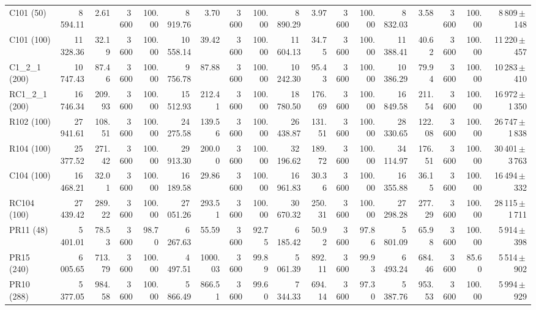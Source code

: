 \documentclass[11pt]{article}
\begin{document}
\begin{table}[H]
{\begin{tabular}{l rrrr rrrr rrrr rrrr r}
C101 (50) & 8\,594.11 & 2.61 & 3\,600 & 100.00 & 8\,919.76 & 3.70 & 3\,600 & 100.00 & 8\,890.29 & 3.97 & 3\,600 & 100.00 & 8\,832.03 & 3.58 & 3\,600 & 100.00 & 8\,809\,$\pm$\,148 \\
C101 (100) & 11\,328.36 & 32.19 & 3\,600 & 100.00 & 10\,558.14 & 39.42 & 3\,600 & 100.00 & 11\,604.13 & 34.75 & 3\,600 & 100.00 & 11\,388.41 & 40.62 & 3\,600 & 100.00 & 11\,220\,$\pm$\,457 \\
C1\_2\_1 (200) & 10\,747.43 & 87.46 & 3\,600 & 100.00 & 9\,756.78 & 87.88 & 3\,600 & 100.00 & 10\,242.30 & 95.43 & 3\,600 & 100.00 & 10\,386.29 & 79.94 & 3\,600 & 100.00 & 10\,283\,$\pm$\,410 \\
\midrule
RC1\_2\_1 (200) & 16\,746.34 & 209.93 & 3\,600 & 100.00 & 15\,512.93 & 212.41 & 3\,600 & 100.00 & 18\,780.50 & 176.69 & 3\,600 & 100.00 & 16\,849.58 & 211.54 & 3\,600 & 100.00 & 16\,972\,$\pm$\,1\,350 \\
\midrule
R102 (100) & 27\,941.61 & 108.51 & 3\,600 & 100.00 & 24\,275.58 & 139.56 & 3\,600 & 100.00 & 26\,438.87 & 131.51 & 3\,600 & 100.00 & 28\,330.65 & 122.08 & 3\,600 & 100.00 & 26\,747\,$\pm$\,1\,838 \\
R104 (100) & 25\,377.52 & 271.42 & 3\,600 & 100.00 & 29\,913.30 & 200.00 & 3\,600 & 100.00 & 32\,196.62 & 189.72 & 3\,600 & 100.00 & 34\,114.97 & 176.51 & 3\,600 & 100.00 & 30\,401\,$\pm$\,3\,763 \\
C104 (100) & 16\,468.21 & 32.01 & 3\,600 & 100.00 & 16\,189.58 & 29.86 & 3\,600 & 100.00 & 16\,961.83 & 30.36 & 3\,600 & 100.00 & 16\,355.88 & 36.15 & 3\,600 & 100.00 & 16\,494\,$\pm$\,332 \\
RC104 (100) & 27\,439.42 & 289.22 & 3\,600 & 100.00 & 27\,051.26 & 293.51 & 3\,600 & 100.00 & 30\,670.32 & 250.31 & 3\,600 & 100.00 & 27\,298.28 & 277.29 & 3\,600 & 100.00 & 28\,115\,$\pm$\,1\,711 \\
\midrule
PR11 (48) & 5\,401.01 & 78.53 & 3\,600 & 98.70 & 6\,267.63 & 55.59 & 3\,600 & 92.75 & 6\,185.42 & 50.92 & 3\,600 & 97.86 & 5\,801.09 & 65.98 & 3\,600 & 100.00 & 5\,914\,$\pm$\,398 \\
PR15 (240) & 6\,005.65 & 713.79 & 3\,600 & 100.00 & 4\,497.51 & 1000.03 & 3\,600 & 99.89 & 5\,061.39 & 892.11 & 3\,600 & 99.93 & 6\,493.24 & 684.46 & 3\,600 & 85.60 & 5\,514\,$\pm$\,902 \\
PR10 (288) & 5\,377.05 & 984.58 & 3\,600 & 100.00 & 5\,866.49 & 866.51 & 3\,600 & 99.60 & 7\,344.33 & 694.14 & 3\,600 & 97.30 & 5\,387.76 & 953.53 & 3\,600 & 100.00 & 5\,994\,$\pm$\,929 \\
\bottomrule
\end{tabular}%
}
\end{table}
\end{document}
